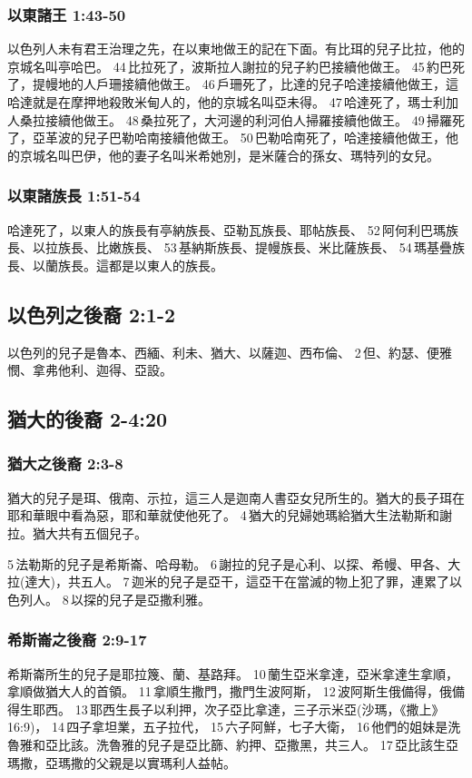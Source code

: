            
\subsubsection{以東諸王 1:43-50}
以色列人未有君王治理之先，在以東地做王的記在下面。有比珥的兒子比拉，他的京城名叫亭哈巴。 44 比拉死了，波斯拉人謝拉的兒子約巴接續他做王。 45 約巴死了，提幔地的人戶珊接續他做王。 46 戶珊死了，比達的兒子哈達接續他做王，這哈達就是在摩押地殺敗米甸人的，他的京城名叫亞未得。 47 哈達死了，瑪士利加人桑拉接續他做王。 48 桑拉死了，大河邊的利河伯人掃羅接續他做王。 49 掃羅死了，亞革波的兒子巴勒哈南接續他做王。 50 巴勒哈南死了，哈達接續他做王，他的京城名叫巴伊，他的妻子名叫米希她別，是米薩合的孫女、瑪特列的女兒。

\subsubsection{以東諸族長 1:51-54}
哈達死了，以東人的族長有亭納族長、亞勒瓦族長、耶帖族長、 52 阿何利巴瑪族長、以拉族長、比嫩族長、 53 基納斯族長、提幔族長、米比薩族長、 54 瑪基疊族長、以蘭族長。這都是以東人的族長。

\subsection{以色列之後裔 2:1-2}
以色列的兒子是魯本、西緬、利未、猶大、以薩迦、西布倫、 2 但、約瑟、便雅憫、拿弗他利、迦得、亞設。

\subsection{猶大的後裔 2-4:20 }
\subsubsection{猶大之後裔 2:3-8}
猶大的兒子是珥、俄南、示拉，這三人是迦南人書亞女兒所生的。猶大的長子珥在耶和華眼中看為惡，耶和華就使他死了。 4 猶大的兒婦她瑪給猶大生法勒斯和謝拉。猶大共有五個兒子。

5 法勒斯的兒子是希斯崙、哈母勒。 6 謝拉的兒子是心利、以探、希幔、甲各、大拉(達大)，共五人。 7 迦米的兒子是亞干，這亞干在當滅的物上犯了罪，連累了以色列人。 8 以探的兒子是亞撒利雅。


\subsubsection{希斯崙之後裔 2:9-17}
希斯崙所生的兒子是耶拉篾、蘭、基路拜。 10 蘭生亞米拿達，亞米拿達生拿順，拿順做猶大人的首領。 11 拿順生撒門，撒門生波阿斯， 12 波阿斯生俄備得，俄備得生耶西。 13 耶西生長子以利押，次子亞比拿達，三子示米亞(沙瑪，《撒上》16:9)， 14 四子拿坦業，五子拉代， 15 六子阿鮮，七子大衛， 16 他們的姐妹是洗魯雅和亞比該。洗魯雅的兒子是亞比篩、約押、亞撒黑，共三人。 17 亞比該生亞瑪撒，亞瑪撒的父親是以實瑪利人益帖。

